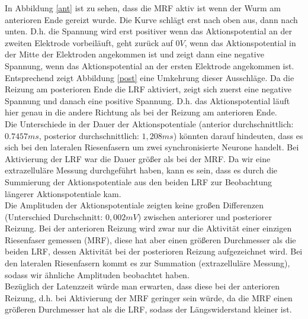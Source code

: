 \documentclass[11pt]{article}
\begin{document}
In Abbildung \ref{ant} ist zu sehen, dass die MRF aktiv ist wenn der Wurm am anterioren Ende gereizt wurde. Die Kurve schlägt erst nach oben aus, dann nach unten. D.h. die Spannung wird erst positiver wenn das Aktionspotential an der zweiten Elektrode vorbeiläuft, geht zurück auf $0V$, wenn das Aktionspotential in der Mitte der Elektroden angekommen ist und zeigt dann eine negative Spannung, wenn das Aktionspotential an der ersten Elektrode angekommen ist. \\
Entsprechend zeigt Abbildung \ref{post} eine Umkehrung dieser Ausschläge. Da die Reizung am posterioren Ende die LRF aktiviert, zeigt sich zuerst eine negative Spannung und danach eine positive Spannung. D.h. das Aktionspotential läuft hier genau in die andere Richtung als bei der Reizung am anterioren Ende. \\
Die Unterschiede in der Dauer der Aktionspotentiale (anterior durchschnittlich: $0.7457ms$, posterior durchschnittlich: $1,208ms$) könnten darauf hindeuten, dass es sich bei den lateralen Riesenfasern um zwei \glqq synchronisierte\grqq{} Neurone handelt. Bei Aktivierung der LRF war die Dauer größer als bei der MRF. Da wir eine extrazelluläre Messung durchgeführt haben, kann es sein, dass es durch die Summierung der Aktionspotentiale aus den beiden LRF zur Beobachtung längerer Aktionspotentiale kam. \\
Die Amplituden der Aktionspotentiale zeigten keine großen Differenzen (Unterschied Durchschnitt: $0,002mV$) zwischen anteriorer und posteriorer Reizung. Bei der anterioren Reizung wird zwar nur die Aktivität einer einzigen Riesenfaser gemessen (MRF), diese hat aber einen größeren Durchmesser als die beiden LRF, dessen Aktivität bei der posterioren Reizung aufgezeichnet wird. Bei den lateralen Riesenfasern kommt es zur Summation (extrazelluläre Messung), sodass wir ähnliche Amplituden beobachtet haben. \\
Bezüglich der Latenzzeit würde man erwarten, dass diese bei der anterioren Reizung, d.h. bei Aktivierung der MRF geringer sein würde, da die MRF einen größeren Durchmesser hat als die LRF, sodass der Längswiderstand kleiner ist. \\

\end{document}
